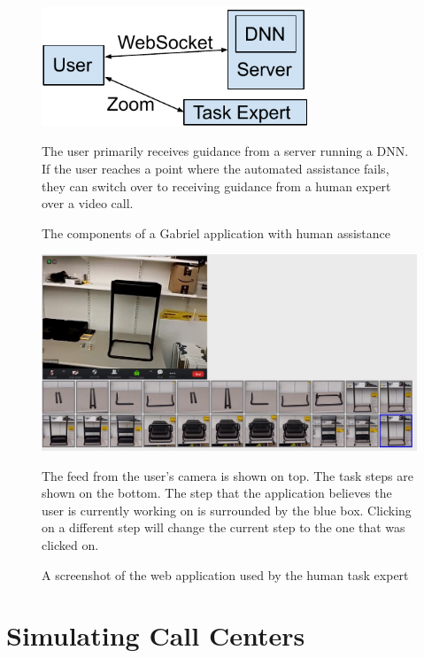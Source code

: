 \begin{figure}[h]
  \includegraphics[width=8cm]{figures/human_assitance.pdf}
  \begin{captiontext}
    The user primarily receives guidance from a server running a DNN.
    If the user reaches a point where the automated assistance fails, they can
    switch over to receiving guidance from a human expert over a video call.
  \end{captiontext}
  \caption{
    The components of a Gabriel application with human assistance
  }\label{fig:expert_components}
  \vspace{0.4in}
\end{figure}

\begin{figure}[h]
  \includegraphics[width=\textwidth]{figures/expert_ui.png}
  \begin{captiontext}
    The feed from the user's camera is shown on top. The task steps are shown on
    the bottom. The step that the application believes the user is currently
    working on is surrounded by the
    blue box. Clicking on a different step will change the current step
    to the one that was clicked on.
  \end{captiontext}
  \caption{A screenshot of the web application used by the human task expert
  }\label{fig:expertui}
\end{figure}

\section{Simulating Call Centers}

